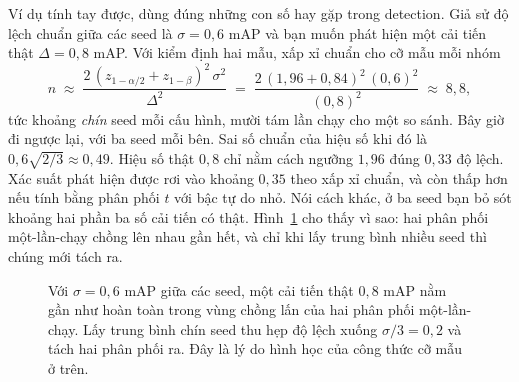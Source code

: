 \documentclass[../../deep_learning.tex]{subfiles}
\begin{document}
Ví dụ tính tay được, dùng đúng những con số hay gặp trong detection. Giả sử độ lệch chuẩn giữa các seed là \(\sigma = 0{,}6\) mAP và bạn muốn phát hiện một cải tiến thật \(\Delta = 0{,}8\) mAP. Với kiểm định hai mẫu, xấp xỉ chuẩn cho cỡ mẫu mỗi nhóm
\[
n \;\approx\; \frac{2\,(z_{1-\alpha/2}+z_{1-\beta})^2\,\sigma^2}{\Delta^2}
\;=\; \frac{2\,(1{,}96+0{,}84)^2\,(0{,}6)^2}{(0{,}8)^2} \;\approx\; 8{,}8 ,
\]
tức khoảng \emph{chín} seed mỗi cấu hình, mười tám lần chạy cho một so sánh. Bây giờ đi ngược lại, với ba seed mỗi bên. Sai số chuẩn của hiệu số khi đó là \(0{,}6\sqrt{2/3} \approx 0{,}49\). Hiệu số thật \(0{,}8\) chỉ nằm cách ngưỡng \(1{,}96\) đúng \(0{,}33\) độ lệch. Xác suất phát hiện được rơi vào khoảng \(0{,}35\) theo xấp xỉ chuẩn, và còn thấp hơn nếu tính bằng phân phối \(t\) với bậc tự do nhỏ. Nói cách khác, ở ba seed bạn bỏ sót khoảng hai phần ba số cải tiến có thật. Hình~\ref{fig:san-nhieu} cho thấy vì sao: hai phân phối một-lần-chạy chồng lên nhau gần hết, và chỉ khi lấy trung bình nhiều seed thì chúng mới tách ra.

\begin{figure}[H]\centering
{}
\caption{Với \(\sigma=0{,}6\) mAP giữa các seed, một cải tiến thật \(0{,}8\) mAP nằm gần như hoàn toàn trong vùng chồng lấn của hai phân phối một-lần-chạy. Lấy trung bình chín seed thu hẹp độ lệch xuống \(\sigma/3=0{,}2\) và tách hai phân phối ra. Đây là lý do hình học của công thức cỡ mẫu ở trên.}
\label{fig:san-nhieu}
\end{figure}
\end{document}
